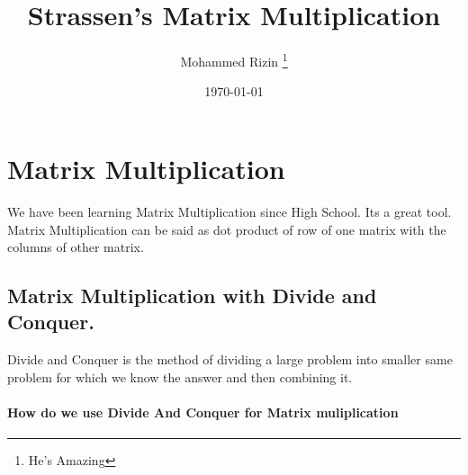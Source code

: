 \documentclass[11pt, a4paper]{article}
\title{Strassen's Matrix Multiplication }
\author[1] {Mohammed Rizin \footnote{He's Amazing}}
\affiliation[1]{Umemployed, Navi Mumbai, Maharashtra}
\date{\today}
\begin{document}
\maketitle
\flushbottom

\section {Matrix Multiplication}
We have been learning Matrix Multiplication since High School. Its a great tool. Matrix Multiplication can be said as dot product of row of one matrix with the columns of other matrix.

\subsection{Matrix Multiplication with Divide and Conquer.}
Divide and Conquer is the method of dividing a large problem into smaller same problem for which we know the answer and then combining it. 
\paragraph{How do we use Divide And Conquer for Matrix muliplication}
\end{document}
